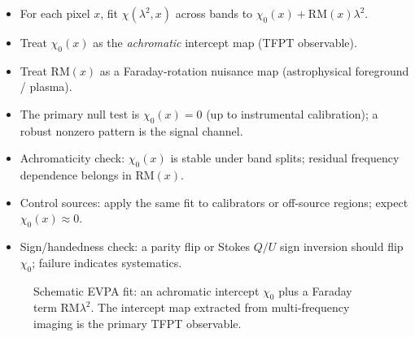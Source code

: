 \begin{tcolorbox}[colback=gray!5, colframe=gray!60, breakable,
title={\textbf{EHT Intercept Map Procedure (achromatic intercept $\chi_0$)}}, fonttitle=\bfseries\small]
\begin{itemize}[leftmargin=1.5em, topsep=2pt, itemsep=2pt]
    \item For each pixel $x$, fit $\chi(\lambda^2,x)$ across bands to $\chi_0(x)+\mathrm{RM}(x)\lambda^2$.
    \item Treat $\chi_0(x)$ as the \emph{achromatic} intercept map (TFPT observable).
    \item Treat $\mathrm{RM}(x)$ as a Faraday-rotation nuisance map (astrophysical foreground / plasma).
    \item The primary null test is $\chi_0(x)=0$ (up to instrumental calibration); a robust nonzero pattern is the signal channel.
    \item Achromaticity check: $\chi_0(x)$ is stable under band splits; residual frequency dependence belongs in $\mathrm{RM}(x)$.
    \item Control sources: apply the same fit to calibrators or off-source regions; expect $\chi_0(x)\approx 0$.
    \item Sign/handedness check: a parity flip or Stokes $Q/U$ sign inversion should flip $\chi_0$; failure indicates systematics.
\end{itemize}
\end{tcolorbox}

\begin{figure}[H]
\centering
{}
\caption{Schematic EVPA fit: an achromatic intercept $\chi_0$ plus a Faraday term $\mathrm{RM}\lambda^2$. The intercept map extracted from multi-frequency imaging is the primary TFPT observable.}
\label{fig:evpa_intercept}
\end{figure}

